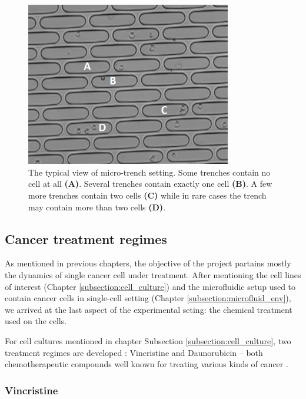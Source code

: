 \documentclass[pdftex,12pt,a4paper]{report}
\begin{document}
\begin{figure}[H]
\centering
\includegraphics[width=0.8\textwidth]{images/microtrench_in}
\caption{The typical view of micro-trench setting. Some trenches contain no cell at all \textbf{(A)}. Several trenches contain exactly one cell \textbf{(B)}. A few more trenches contain two cells \textbf{(C)} while in rare cases the trench may contain more than two cells \textbf{(D)}.}
\label{fig:microtrench_sample}
\end{figure}

\subsection{Cancer treatment regimes}
\label{subsection:treatment}

As mentioned in previous chapters, the objective of the project partains mostly the dynamics of single cancer cell under treatment. After mentioning the cell lines of interest (Chapter \ref{subsection:cell_culture}) and the microfluidic setup used to contain cancer cells in single-cell setting (Chapter \ref{subsection:microfluid_env}), we arrived at the last aspect of the experimental seting: the chemical treatment used on the cells.

For cell cultures mentioned in chapter Subsection \ref{subsection:cell_culture}, two treatment regimes are developed : Vincristine and Daunorubicin -- both chemotherapeutic compounds well known for treating various kinds of cancer \cite{drugs2018defdaunorubicin, ravina2011evolution, tsuruo1981overcoming, gewirtz1999critical}.

\subsubsection*{Vincristine}
\end{document}
